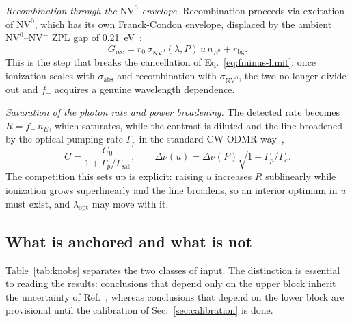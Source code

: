 \documentclass[preprint,12pt]{elsarticle}
\newcommand{\NVm}{\ensuremath{\mathrm{NV}^{-}}}
\newcommand{\NVz}{\ensuremath{\mathrm{NV}^{0}}}
\newcommand{\sabs}{\ensuremath{\sigma_{\mathrm{abs}}}}
\newcommand{\fm}{\ensuremath{f_{-}}}
\newcommand{\lopt}{\ensuremath{\lambda_{\mathrm{opt}}}}
\begin{document}
\emph{Recombination through the \NVz{} envelope.} Recombination proceeds via
excitation of \NVz{}, which has its own Franck-Condon envelope, displaced by the
ambient \NVz{}--\NVm{} ZPL gap of \SI{0.21}{\electronvolt}~\cite{Doherty2013}:
\begin{equation}
  G_{\mathrm{rec}} = r_0\,\sigma_{\NVz}(\lambda,P)\,u\,n_{E^0} + r_{\mathrm{bg}} .
\end{equation}
This is the step that breaks the cancellation of Eq.~\eqref{eq:fminus-limit}:
once ionization scales with $\sabs$ and recombination with $\sigma_{\NVz}$, the
two no longer divide out and $\fm$ acquires a genuine wavelength dependence.

\emph{Saturation of the photon rate and power broadening.} The detected rate
becomes $R = \fm\,n_E$, which saturates, while the contrast is diluted and the
line broadened by the optical pumping rate $\Gamma_p$ in the standard CW-ODMR
way~\cite{Dreau2011},
\begin{equation}
  C = \frac{C_0}{1 + \Gamma_p/\Gamma_{\mathrm{sat}}},
  \qquad
  \Delta\nu(u) = \Delta\nu(P)\sqrt{1 + \Gamma_p/\Gamma_c} .
\end{equation}
The competition this sets up is explicit: raising $u$ increases $R$ sublinearly
while ionization grows superlinearly and the line broadens, so an interior
optimum in $u$ must exist, and $\lopt$ may move with it.

\subsection{What is anchored and what is not}
\label{sec:model:knobs}

Table~\ref{tab:knobs} separates the two classes of input. The distinction is
essential to reading the results: conclusions that depend only on the upper block
inherit the uncertainty of Ref.~\cite{Ho2026}, whereas conclusions that depend on
the lower block are provisional until the calibration of
Sec.~\ref{sec:calibration} is done.
\end{document}
